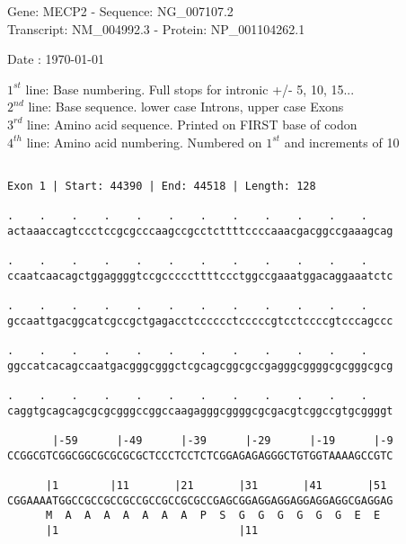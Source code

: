 \documentclass{article}
\begin{document}
\begin{center}
\begin{large}
Gene: MECP2 - Sequence: NG\_007107.2\\
Transcript: NM\_004992.3 - Protein: NP\_001104262.1
 
 Date : \today
\end{large}
\end{center}
$1^{st}$ line: Base numbering. Full stops for intronic +/- 5, 10, 15...\\
$2^{nd}$ line: Base sequence. lower case Introns, upper case Exons\\
$3^{rd}$ line: Amino acid sequence. Printed on FIRST base of codon\\
$4^{th}$ line: Amino acid numbering. Numbered on $1^{st}$ and increments of 10\\
 \begin{Verbatim}
 
Exon 1 | Start: 44390 | End: 44518 | Length: 128
 
.    .    .    .    .    .    .    .    .    .    .    .    
actaaaccagtccctccgcgcccaagccgcctcttttccccaaacgacggccgaaagcag
                                                            
.    .    .    .    .    .    .    .    .    .    .    .    
ccaatcaacagctggaggggtccgcccccttttccctggccgaaatggacaggaaatctc
                                                            
.    .    .    .    .    .    .    .    .    .    .    .    
gccaattgacggcatcgccgctgagacctcccccctcccccgtcctccccgtcccagccc
                                                            
.    .    .    .    .    .    .    .    .    .    .    .    
ggccatcacagccaatgacgggcgggctcgcagcggcgccgagggcggggcgcgggcgcg
                                                            
.    .    .    .    .    .    .    .    .    .    .    .    
caggtgcagcagcgcgcgggccggccaagagggcggggcgcgacgtcggccgtgcggggt
                                                            
       |-59      |-49      |-39      |-29      |-19      |-9
CCGGCGTCGGCGGCGCGCGCGCTCCCTCCTCTCGGAGAGAGGGCTGTGGTAAAAGCCGTC
                                                            
      |1        |11       |21       |31       |41       |51 
CGGAAAATGGCCGCCGCCGCCGCCGCCGCGCCGAGCGGAGGAGGAGGAGGAGGCGAGGAG
      M  A  A  A  A  A  A  A  P  S  G  G  G  G  G  G  E  E  
      |1                            |11                     
  

\end{Verbatim}
\end{document}
